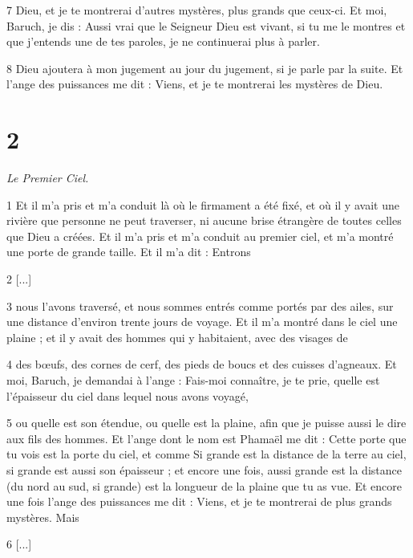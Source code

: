 \par 7 Dieu, et je te montrerai d'autres mystères, plus grands que ceux-ci. Et moi, Baruch, je dis : Aussi vrai que le Seigneur Dieu est vivant, si tu me le montres et que j'entends une de tes paroles, je ne continuerai plus à parler.

\par 8 Dieu ajoutera à mon jugement au jour du jugement, si je parle par la suite. Et l'ange des puissances me dit : Viens, et je te montrerai les mystères de Dieu.

\chapter{2}

\par \textit{Le Premier Ciel.}

\par 1 Et il m'a pris et m'a conduit là où le firmament a été fixé, et où il y avait une rivière que personne ne peut traverser, ni aucune brise étrangère de toutes celles que Dieu a créées. Et il m'a pris et m'a conduit au premier ciel, et m'a montré une porte de grande taille. Et il m'a dit : Entrons

\par 2 [...]

\par 3 nous l'avons traversé, et nous sommes entrés comme portés par des ailes, sur une distance d'environ trente jours de voyage. Et il m'a montré dans le ciel une plaine ; et il y avait des hommes qui y habitaient, avec des visages de

\par 4 des bœufs, des cornes de cerf, des pieds de boucs et des cuisses d'agneaux. Et moi, Baruch, je demandai à l'ange : Fais-moi connaître, je te prie, quelle est l'épaisseur du ciel dans lequel nous avons voyagé,

\par 5 ou quelle est son étendue, ou quelle est la plaine, afin que je puisse aussi le dire aux fils des hommes. Et l'ange dont le nom est Phamaël me dit : Cette porte que tu vois est la porte du ciel, et comme Si grande est la distance de la terre au ciel, si grande est aussi son épaisseur ; et encore une fois, aussi grande est la distance (du nord au sud, si grande) est la longueur de la plaine que tu as vue. Et encore une fois l'ange des puissances me dit : Viens, et je te montrerai de plus grands mystères. Mais

\par 6 [...]

